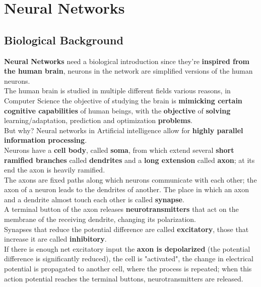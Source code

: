 \section{Neural Networks}

\subsection{Biological Background}
\textbf{Neural Networks} need a biological introduction since they're \textbf{inspired from the human brain}, neurons in the network are simplified versions of the human neurons.\\

The human brain is studied in multiple different fields various reasons, in Computer Science the objective of studying the brain is \textbf{mimicking certain cognitive capabilities} of human beings, with the \textbf{objective} of \textbf{solving} learning/adaptation, prediction and optimization \textbf{problems}.\\

But why? Neural networks in Artificial intelligence allow for \textbf{highly parallel information processing}.\\

Neurons have a \textbf{cell body}, called \textbf{soma}, from which extend several \textbf{short ramified branches} called \textbf{dendrites} and a \textbf{long extension} called \textbf{axon}; at its end the axon is heavily ramified.\\

The axons are fixed paths along which neurons communicate with each other; the axon of a neuron leads to the dendrites of another. The place in which an axon and a dendrite almost touch each other is called \textbf{synapse}.\\

A terminal button of the axon releases \textbf{neurotransmitters} that act on the membrane of the receiving dendrite, changing its polarization.\\
Synapses that reduce the potential difference are called \textbf{excitatory}, those that increase it are called \textbf{inhibitory}.\\

If there is enough net excitatory input the \textbf{axon is depolarized} (the potential difference is significantly reduced), the cell is "activated", the change in electrical potential is propagated to another cell, where the process is repeated; when this action potential reaches the terminal buttons, neurotransmitters are released.\\

